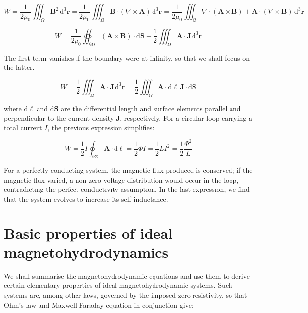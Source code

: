 \begin{equation}
    W=\frac{1}{2\mu_0}\iiint_{\Omega}\mathbf{B}^2\,\mathrm{d}^3\mathbf{r}=\frac{1}{2\mu_0}\iiint_\Omega\mathbf{B}\cdot(\nabla\times\mathbf{A})\,\mathrm{d}^3\mathbf{r}=\frac{1}{2\mu_0}\iiint_\Omega\nabla\cdot(\mathbf{A}\times\mathbf{B})+\mathbf{A}\cdot(\nabla\times\mathbf{B})\,\mathrm{d}^3\mathbf{r}
\end{equation}

\begin{equation}
    W=\frac{1}{2\mu_0}\oiint_{\partial\Omega}(\mathbf{A}\times\mathbf{B})\cdot\mathrm{d}\mathbf{S}+\frac{1}{2}\iiint_\Omega\mathbf{A}\cdot\mathbf{J}\,\mathrm{d}^3\mathbf{r}
\end{equation}

The first term vanishes if the boundary were at infinity, so that we shall focus on the latter.

\begin{equation}
    W=\frac{1}{2}\iiint_\Omega\mathbf{A}\cdot\mathbf{J}\,\mathrm{d}^3\mathbf{r}=\frac{1}{2}\iiint_\Omega\mathbf{A}\cdot\mathrm{d}\boldsymbol{\ell}\,\mathbf{J}\cdot\mathrm{d}\mathbf{S}
\end{equation}

where $\mathrm{d}\boldsymbol{\ell}$ and $\mathrm{d}\mathbf{S}$ are the differential length and surface elements parallel and perpendicular to the current density $\mathbf{J}$, respectively. For a circular loop carrying a total current $I$, the previous expression simplifies:

\begin{equation}
    W=\frac{1}{2}I\oint_{\partial\Sigma}\mathbf{A}\cdot\mathrm{d}\boldsymbol{\ell}=\frac{1}{2}\Phi I=\frac{1}{2}LI^2=\frac{1}{2}\frac{\Phi^2}{L}
\end{equation}

For a perfectly conducting system, the magnetic flux produced is conserved; if the magnetic flux varied, a non-zero voltage distribution would occur in the loop, contradicting the perfect-conductivity assumption. In the last expression, we find that the system evolves to increase its self-inductance.

\section{Basic properties of ideal magnetohydrodynamics}

We shall summarise the magnetohydrodynamic equations and use them to derive certain elementary properties of ideal magnetohydrodynamic systems. Such systems are, among other laws, governed by the imposed zero resistivity, so that Ohm's law and Maxwell-Faraday equation in conjunction give:

